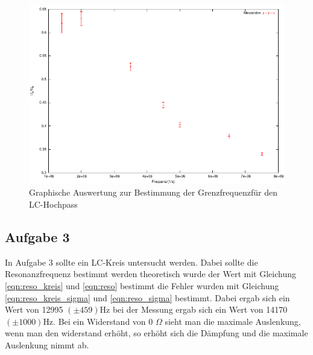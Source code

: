 \documentclass[12pt]{scrartcl}
\begin{document}
\begin{figure}[htbp] 
  \centering
    \includegraphics[scale = 1]{teil_6.pdf}
  	\caption[Graphische Auswertung zur Bestimmung der Grenzfrequenz für den LC-Hochpass]{Graphische Auswertung zur Bestimmung der Grenzfrequenzfür den LC-Hochpass}
  \label{fig:teil_6}
\end{figure}

\newpage

\subsection{Aufgabe 3}

In Aufgabe 3 sollte ein LC-Kreis untersucht werden. Dabei sollte die Resonanzfrequenz bestimmt werden theoretisch wurde der Wert mit Gleichung \ref{eqn:reso_kreis} und \ref{eqn:reso} bestimmt die Fehler wurden mit Gleichung \ref{eqn:reso_kreis_sigma} und \ref{eqn:reso_sigma} bestimmt.
Dabei ergab sich ein Wert von 12995 $(\pm 459)$Hz bei der Messung ergab sich ein Wert von 14170 $(\pm 1000)$Hz. Bei ein Widerstand von 0 $\Omega$ sieht man die maximale Auslenkung, wenn man den widerstand erhöht, so erhöht sich die Dämpfung und die maximale Auslenkung nimmt ab.
\end{document}
